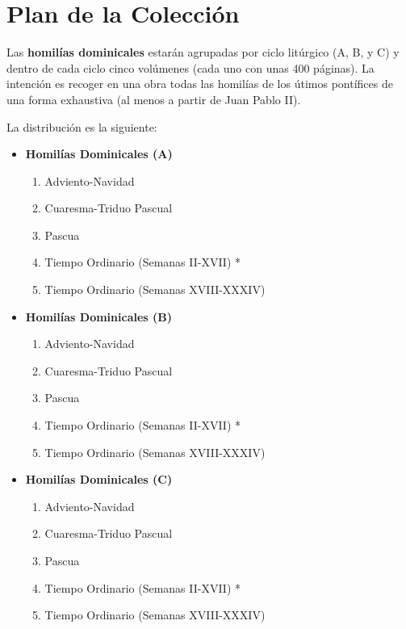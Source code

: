 \section {Plan de la Colección}


\begin{bodyintro}Las \textbf{homilías dominicales} estarán agrupadas por ciclo litúrgico (A, B, y C) y dentro de cada ciclo cinco volúmenes (cada uno con unas 400 páginas). La intención es recoger en una obra todas las homilías de los útimos pontífices de una forma exhaustiva (al menos a partir de Juan Pablo II).\end{bodyintro}

\begin{bodyintro}La distribución es la siguiente:\end{bodyintro}

\begin{itemize}
	\item \textbf {Homilías Dominicales (A)}
	\begin{enumerate}
		\renewcommand{\labelenumii}{\arabic{enumii}.}
		\item Adviento-Navidad
		\item Cuaresma-Triduo Pascual
		\item Pascua
		\item Tiempo Ordinario (Semanas II-XVII) *
		\item Tiempo Ordinario (Semanas XVIII-XXXIV)
	\end{enumerate}
\end{itemize}

\begin{itemize}
	\item \textbf {Homilías Dominicales (B)}
	\begin{enumerate}
		\renewcommand{\labelenumii}{\arabic{enumii}.}
		\item Adviento-Navidad
		\item Cuaresma-Triduo Pascual
		\item Pascua
		\item Tiempo Ordinario (Semanas II-XVII) *
		\item Tiempo Ordinario (Semanas XVIII-XXXIV)
	\end{enumerate}
\end{itemize}

\begin{itemize}
	\item \textbf {Homilías Dominicales (C)}
	\begin{enumerate}
		\renewcommand{\labelenumii}{\arabic{enumii}.}
		\item Adviento-Navidad
		\item Cuaresma-Triduo Pascual
		\item Pascua
		\item Tiempo Ordinario (Semanas II-XVII) *
		\item Tiempo Ordinario (Semanas XVIII-XXXIV)
	\end{enumerate}
\end{itemize}


